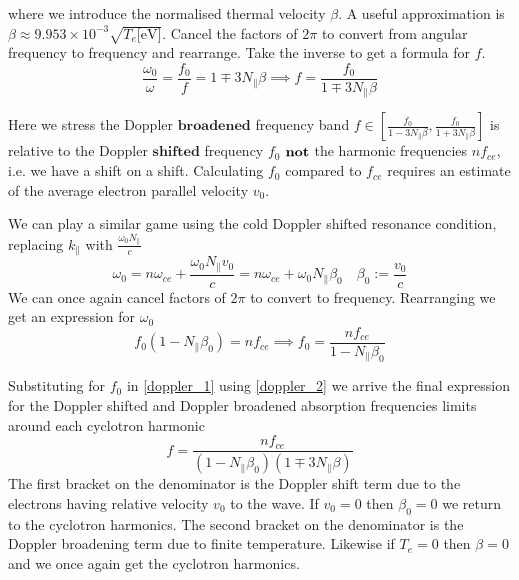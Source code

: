 where we introduce the normalised thermal velocity $\beta$. A useful approximation is $\beta \approx 9.953 \times 10^{-3} \sqrt{T_e\text{[eV]}}$. Cancel the factors of $2\pi$ to convert from angular frequency to frequency and rearrange. Take the inverse to get a formula for $f$. 
\begin{equation}\label{doppler_1}
	\frac{\omega_0}{\omega} = \frac{f_0}{f} = 1 \mp 3N_{\parallel}\beta \implies f = \frac{f_0}{1 \mp 3N_{\parallel}\beta}
\end{equation}

Here we stress the Doppler $\textbf{broadened}$ frequency band $f \in \left[ \frac{f_0}{1 - 3N_{\parallel}\beta}, \frac{f_0}{1 + 3N_{\parallel}\beta} \right]$ is relative to the Doppler $\textbf{shifted}$ frequency $f_0$ $\bf{not}$ the harmonic frequencies $nf_{ce}$, i.e. we have a shift on a shift. Calculating $f_0$ compared to $f_{ce}$ requires an estimate of the average electron parallel velocity $v_0$.

We can play a similar game using the cold Doppler shifted resonance condition, replacing $k_{\parallel}$ with $\frac{\omega_0 N_{\parallel}}{c}$
\begin{equation}\label{doppler_2}
	\omega_0 = n \omega_{ce} + \frac{\omega_0 N_{\parallel} v_0}{c} =  n \omega_{ce} + \omega_0 N_{\parallel} \beta_0 \quad \beta_0 := \frac{v_0}{c}
\end{equation}
We can once again cancel factors of $2\pi$ to convert to frequency. Rearranging we get an expression for $\omega_0$
\begin{equation}
	f_0 \left(1 - N_{\parallel} \beta_0 \right)=  n f_{ce} \implies f_0 = \frac{n f_{ce}}{1 - N_{\parallel} \beta_0}
\end{equation}

Substituting for $f_0$ in \eqref{doppler_1} using \eqref{doppler_2} we arrive the final expression for the Doppler shifted and Doppler broadened absorption frequencies limits around each cyclotron harmonic
\begin{equation}\label{doppler_final}
	f = \frac{nf_{ce}}{  \left( 1 - N_{\parallel} \beta_0 \right) \left( 1 \mp 3N_{\parallel}\beta \right) }
\end{equation}
The first bracket on the denominator is the Doppler shift term due to the electrons having relative velocity $v_0$ to the wave. If $v_0 = 0$ then $\beta_0 = 0$ we return to the cyclotron harmonics. The second bracket on the denominator is the Doppler broadening term due to finite temperature. Likewise if $T_e=0$ then $\beta = 0$ and we once again get the cyclotron harmonics.

